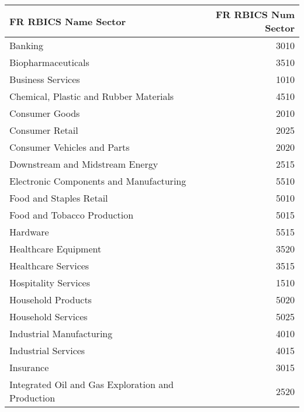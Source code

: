 \begin{tabular}{lr}
\hline
 FR RBICS Name Sector                              &   FR RBICS Num Sector \\
\hline
 Banking                                           &                  3010 \\
 Biopharmaceuticals                                &                  3510 \\
 Business Services                                 &                  1010 \\
 Chemical, Plastic and Rubber Materials            &                  4510 \\
 Consumer Goods                                    &                  2010 \\
 Consumer Retail                                   &                  2025 \\
 Consumer Vehicles and Parts                       &                  2020 \\
 Downstream and Midstream Energy                   &                  2515 \\
 Electronic Components and Manufacturing           &                  5510 \\
 Food and Staples Retail                           &                  5010 \\
 Food and Tobacco Production                       &                  5015 \\
 Hardware                                          &                  5515 \\
 Healthcare Equipment                              &                  3520 \\
 Healthcare Services                               &                  3515 \\
 Hospitality Services                              &                  1510 \\
 Household Products                                &                  5020 \\
 Household Services                                &                  5025 \\
 Industrial Manufacturing                          &                  4010 \\
 Industrial Services                               &                  4015 \\
 Insurance                                         &                  3015 \\
 Integrated Oil and Gas Exploration and Production &                  2520 \\

\end{tabular}
